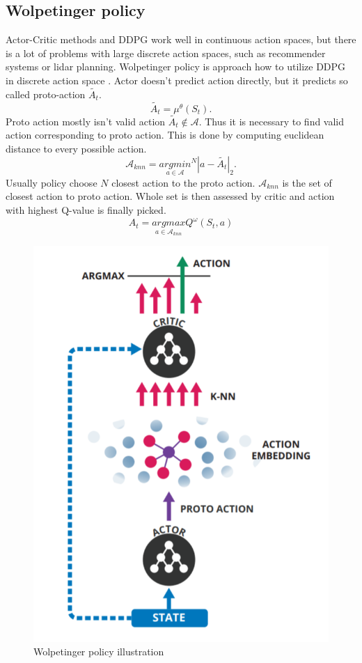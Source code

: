 \subsection{Wolpetinger policy}
Actor-Critic methods and DDPG work well in continuous action spaces, but there is a lot of problems with large discrete action spaces, such as recommender systems or lidar planning. Wolpetinger policy is approach how to utilize DDPG in discrete action space \cite{dulac2015}. Actor doesn't predict action directly, but it predicts so called proto-action $\tilde{A_t}$.
\begin{equation}
\tilde{A_t} = \mu^\theta(S_t).
\end{equation}
Proto action mostly isn't valid action $\tilde{A_t} \notin \mathcal{A}$. Thus it is necessary to find valid action corresponding to proto action. This is done by computing euclidean distance to every possible action.
\begin{equation}
\mathcal{A}_{knn} = \underset{a \in \mathcal{A}}{argmin}^N | a - \tilde{A_t} |_2 .
\end{equation}
Usually policy choose $N$ closest action to the proto action. $\mathcal{A}_{knn}$ is the set of closest action to proto action. Whole set is then assessed by critic and action with highest Q-value is finally picked.
\begin{equation}
A_t = \underset{a \in \mathcal{A}_{knn}}{argmax} Q^\omega(S_t, a)
\end{equation}
\begin{figure}[!h]
\centering
\includegraphics[scale=0.35]{fig/wolpetinger-policy.png}
\caption{Wolpetinger policy illustration}
\end{figure}

